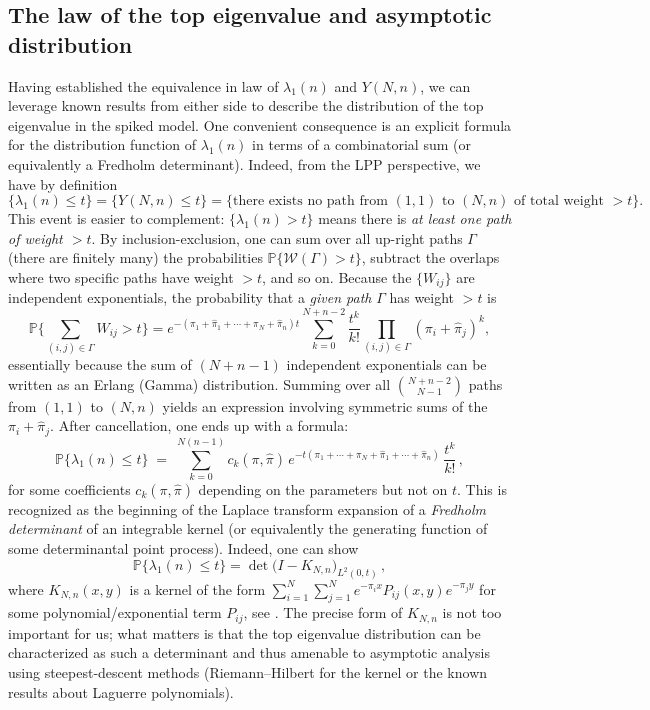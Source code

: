 \documentclass[letterpaper,11pt,oneside,reqno]{article}
\numberwithin{equation}{section}
\theoremstyle{definition}
\begin{document}
\subsection*{The law of the top eigenvalue and asymptotic distribution}
Having established the equivalence in law of $\lambda_1(n)$ and $Y(N,n)$, we can leverage known results from either side to describe the distribution of the top eigenvalue in the spiked model. One convenient consequence is an explicit formula for the distribution function of $\lambda_1(n)$ in terms of a combinatorial sum (or equivalently a Fredholm determinant). Indeed, from the LPP perspective, we have by definition
\[ \{\lambda_1(n) \le t\} = \{Y(N,n) \le t\} = \{\text{there exists no path from $(1,1)$ to $(N,n)$ of total weight $>t$}\}.\]
This event is easier to complement: $\{\lambda_1(n) > t\}$ means there is \emph{at least one path of weight $>t$}. By inclusion-exclusion, one can sum over all up-right paths $\Gamma$ (there are finitely many) the probabilities $\mathbb{P}\{\mathcal{W}(\Gamma) > t\}$, subtract the overlaps where two specific paths have weight $>t$, and so on. Because the $\{W_{ij}\}$ are independent exponentials, the probability that a \emph{given path} $\Gamma$ has weight $>\!t$ is
\[ \mathbb{P}\Big\{\sum_{(i,j)\in\Gamma} W_{ij} > t\Big\} = e^{-(\pi_1+\hat\pi_1+\cdots+\pi_N+\hat\pi_n) t} \sum_{k=0}^{N+n-2} \frac{t^k}{k!} \prod_{(i,j)\in\Gamma} (\pi_i+\hat\pi_j)^k,\]
essentially because the sum of $(N+n-1)$ independent exponentials can be written as an Erlang (Gamma) distribution. Summing over all $\binom{N+n-2}{N-1}$ paths from $(1,1)$ to $(N,n)$ yields an expression involving symmetric sums of the $\pi_i+\hat\pi_j$. After cancellation, one ends up with a formula:
\begin{equation}\label{eq:TWfiniteFredholm}
\mathbb{P}\{\lambda_1(n) \le t\} \;=\; \sum_{k=0}^{N(n-1)} c_{k}(\pi,\hat\pi)\, e^{-t (\pi_1+\cdots+\pi_N+\hat\pi_1+\cdots+\hat\pi_n)}\, \frac{t^k}{k!}\,,
\end{equation}
for some coefficients $c_k(\pi,\hat\pi)$ depending on the parameters but not on $t$. This is recognized as the beginning of the Laplace transform expansion of a \emph{Fredholm determinant} of an integrable kernel (or equivalently the generating function of some determinantal point process). Indeed, one can show
\[ \mathbb{P}\{\lambda_1(n) \le t\} = \det\big(I - K_{N,n}\big)_{L^2(0,t)}\,,\]
where $K_{N,n}(x,y)$ is a kernel of the form $\sum_{i=1}^{N} \sum_{j=1}^{N} e^{-\pi_i x} P_{ij}(x,y) e^{-\pi_j y}$ for some polynomial/exponential term $P_{ij}$, see \cite{BorodinPeche2008}. The precise form of $K_{N,n}$ is not too important for us; what matters is that the top eigenvalue distribution can be characterized as such a determinant and thus amenable to asymptotic analysis using steepest-descent methods (Riemann--Hilbert for the kernel or the known results about Laguerre polynomials).
\end{document}
